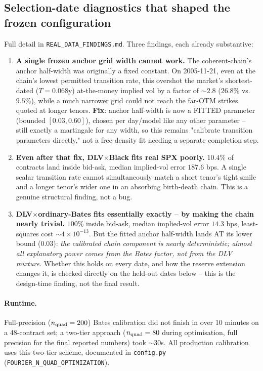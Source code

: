 \subsection{Selection-date diagnostics that shaped the frozen configuration}
\label{sec:selection-diagnostics}

Full detail in \texttt{REAL\_DATA\_FINDINGS.md}. Three findings, each
already substantive:

\begin{enumerate}
\item \textbf{A single frozen anchor grid width cannot work.} The
  coherent-chain's anchor half-width was originally a fixed constant. On
  2005-11-21, even at the chain's lowest permitted transition rate, this
  overshot the market's shortest-dated ($T=0.068$y) at-the-money implied
  vol by a factor of $\sim2.8$ ($26.8\%$ vs.\ $9.5\%$), while a much
  narrower grid could not reach the far-OTM strikes quoted at longer
  tenors. \textbf{Fix}: anchor half-width is now a FITTED parameter
  (bounded $[0.03,0.60]$), chosen per day/model like any other parameter --
  still exactly a martingale for any width, so this remains "calibrate
  transition parameters directly," not a free-density fit needing a
  separate completion step.
\item \textbf{Even after that fix, DLV$\times$Black fits real SPX poorly.}
  $10.4\%$ of contracts land inside bid-ask, median implied-vol error
  $187.6$ bps. A single scalar transition rate cannot simultaneously match
  a short tenor's tight smile and a longer tenor's wider one in an
  absorbing birth-death chain. This is a genuine structural finding, not a
  bug.
\item \textbf{DLV$\times$ordinary-Bates fits essentially exactly -- by
  making the chain nearly trivial.} $100\%$ inside bid-ask, median
  implied-vol error $14.3$ bps, least-squares cost $\sim4\times10^{-13}$.
  But the fitted anchor half-width lands AT its lower bound ($0.03$):
  \emph{the calibrated chain component is nearly deterministic; almost all
  explanatory power comes from the Bates factor, not from the DLV
  mixture.} Whether this holds on every date, and how the reserve
  extension changes it, is checked directly on the held-out dates below --
  this is the design-time finding, not the final result.
\end{enumerate}

\paragraph{Runtime.} Full-precision ($n_{\rm quad}=200$) Bates calibration
did not finish in over 10 minutes on a 48-contract set; a two-tier
approach ($n_{\rm quad}=80$ during optimisation, full precision for the
final reported numbers) took $\sim30$s. All production calibration uses
this two-tier scheme, documented in \texttt{config.py}
(\texttt{FOURIER\_N\_QUAD\_OPTIMIZATION}).
